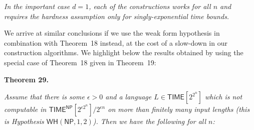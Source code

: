 \emph{In the important case $d=1$, each of the constructions works for all $n$ and requires the hardness assumption only for singly-exponential time bounds.}\par






We arrive at similar conclusions if we use the weak form hypothesis in combination with Theorem 18 instead, at the cost of a slow-down in our construction algorithms. We highlight below the results obtained by using the special case of Theorem 18 given in Theorem 19:\par





\par\medskip\noindent\textbf{
\textbf{Theorem 29}\textbf{.}
}\par



\emph{Assume that there is some $\epsilon>0$ and a language $L\in{\mathsf{TIME}}[2^{2^{n}}]$ which is not computable in ${\mathsf{TIME}}^{\mathsf{NP}}[2^{\epsilon 2^{n}}]/2^{\epsilon n}$ on more than finitely many input lengths (this is Hypothesis $\mathsf{WH}({\mathsf{NP}},1,2)$). Then we have the following for all $n$:}\par


